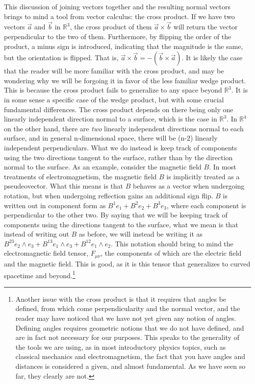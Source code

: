 \documentclass{book}
\begin{document}
	
 This discussion of joining vectors together and the resulting normal vectors brings to mind a tool from vector calculus: the cross product. If we have two vectors $\vec{a}$ and $\vec{b}$ in $\mathbb{R}^3$, the cross product of them $\vec{a} \times \vec{b}$ will return the vector perpendicular to the two of them. Furthermore, by flipping the order of the product, a minus sign is introduced, indicating that the magnitude is the same, but the orientation is flipped. That is, $\vec{a} \times \vec{b} = -(\vec{b} \times \vec{a})$. It is likely the case that the reader will be more familiar with the cross product, and may be wondering why we will be forgoing it in favor of the less familiar wedge product. This is because the cross product fails to generalize to any space beyond $\mathbb{R}^3$. It is in some sense a specific case of the wedge product, but with some crucial fundamental differences. The cross product depends on there being only one linearly independent direction normal to a surface, which is the case in $\mathbb{R}^3$. In $\mathbb{R}^4$ on the other hand, there are \emph{two} linearly independent directions normal to each surface, and in general n-dimensional space, there will be (n-2) linearly independent perpendiculars. What we do instead is keep track of components using the two directions tangent to the surface, rather than by the direction normal to the surface. As an example, consider the magnetic field $B$. In most treatments of electromagnetism, the magnetic field $B$ is implicitly treated as a pseudeovector. What this means is that $B$ behaves as a vector when undergoing rotation, but when undergoing reflection gains an additional sign flip. $B$ is written out in component form as $B^1 e_1 + B^2 e_2 + B^3 e_3$, where each component is perpendicular to the other two. By saying that we will be keeping track of components using the directions tangent to the surface, what we mean is that instead of writing out $B$ as before, we will instead be writing it as $B^{23} e_2\wedge e_3 + B^{13} e_1\wedge e_3 + B^{12} e_1\wedge e_2$. This notation should bring to mind the electromagnetic field tensor, $F_{\mu\nu}$, the components of which are the electric field and the magnetic field. This is good, as it is this tensor that generalizes to curved spacetime and beyond.\footnote{ Another issue with the cross product is that it requires that angles be defined, from which come perpendicularity and the normal vector, and the reader may have noticed that we have not yet given any notion of angles. Defining angles requires geometric notions that we do not have defined, and are in fact not necessary for our purposes. This speaks to the generality of the tools we are  using, as in most introductory physics topics, such as classical mechanics and electromagnetism, the fact that you have angles and distances is considered a given, and almost fundamental. As we have seen so far, they clearly are not.  } 
\end{document}
